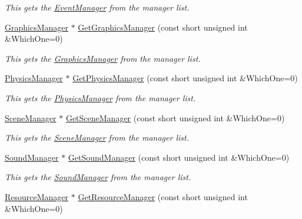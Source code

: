 \begin{DoxyCompactItemize}
\begin{DoxyCompactList}\small\item\em This gets the \hyperlink{classphys_1_1EventManager}{EventManager} from the manager list. \item\end{DoxyCompactList}\item 
\hyperlink{classphys_1_1GraphicsManager}{GraphicsManager} $\ast$ \hyperlink{classphys_1_1World_a15f968adb5d841da6c5eb51607a8f525}{GetGraphicsManager} (const short unsigned int \&WhichOne=0)
\begin{DoxyCompactList}\small\item\em This gets the \hyperlink{classphys_1_1GraphicsManager}{GraphicsManager} from the manager list. \item\end{DoxyCompactList}\item 
\hyperlink{classphys_1_1PhysicsManager}{PhysicsManager} $\ast$ \hyperlink{classphys_1_1World_a1b9eb6206ee15c2ef49665a07de3d83c}{GetPhysicsManager} (const short unsigned int \&WhichOne=0)
\begin{DoxyCompactList}\small\item\em This gets the \hyperlink{classphys_1_1PhysicsManager}{PhysicsManager} from the manager list. \item\end{DoxyCompactList}\item 
\hyperlink{classphys_1_1SceneManager}{SceneManager} $\ast$ \hyperlink{classphys_1_1World_a86a86a78851845837ccc43da8b3a3019}{GetSceneManager} (const short unsigned int \&WhichOne=0)
\begin{DoxyCompactList}\small\item\em This gets the \hyperlink{classphys_1_1SceneManager}{SceneManager} from the manager list. \item\end{DoxyCompactList}\item 
\hyperlink{classphys_1_1SoundManager}{SoundManager} $\ast$ \hyperlink{classphys_1_1World_ac662bf5d5737a99cd3bc3ff45e7d79b8}{GetSoundManager} (const short unsigned int \&WhichOne=0)
\begin{DoxyCompactList}\small\item\em This gets the \hyperlink{classphys_1_1SoundManager}{SoundManager} from the manager list. \item\end{DoxyCompactList}\item 
\hyperlink{classphys_1_1ResourceManager}{ResourceManager} $\ast$ \hyperlink{classphys_1_1World_a8a5381637922598411a4369be6904228}{GetResourceManager} (const short unsigned int \&WhichOne=0)

\end{DoxyCompactItemize}
